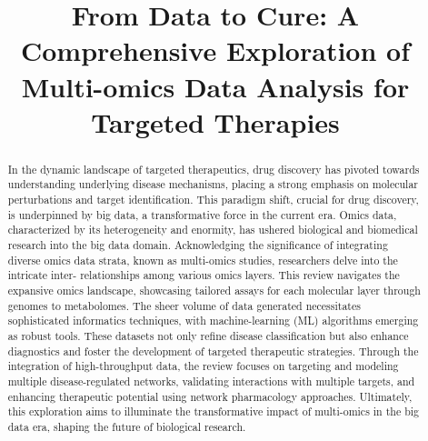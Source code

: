 \title{From Data to Cure: A Comprehensive Exploration of Multi-omics Data Analysis for Targeted Therapies}

\maketitle

\begin{abstract}
In the dynamic landscape of targeted therapeutics, drug discovery has pivoted towards understanding underlying disease mechanisms, placing a strong emphasis on molecular perturbations and target identification. This paradigm shift, crucial for drug discovery, is underpinned by big data, a transformative force in the current era. Omics data, characterized by its heterogeneity and enormity, has ushered biological and biomedical research into the big data domain. Acknowledging the significance of integrating diverse omics data strata, known as multi-omics studies, researchers delve into the intricate inter- relationships among various omics layers. This review navigates the expansive omics landscape, showcasing tailored assays for each molecular layer through genomes to metabolomes. The sheer volume of data generated necessitates sophisticated informatics techniques, with machine-learning (ML) algorithms emerging as robust tools. These datasets not only refine disease classification but also enhance diagnostics and foster the development of targeted therapeutic strategies. Through the integration of high-throughput data, the review focuses on targeting and modeling multiple disease-regulated networks, validating interactions with multiple targets, and enhancing therapeutic potential using network pharmacology approaches. Ultimately, this exploration aims to illuminate the transformative impact of multi-omics in the big data era, shaping the future of biological research.
\end{abstract}

